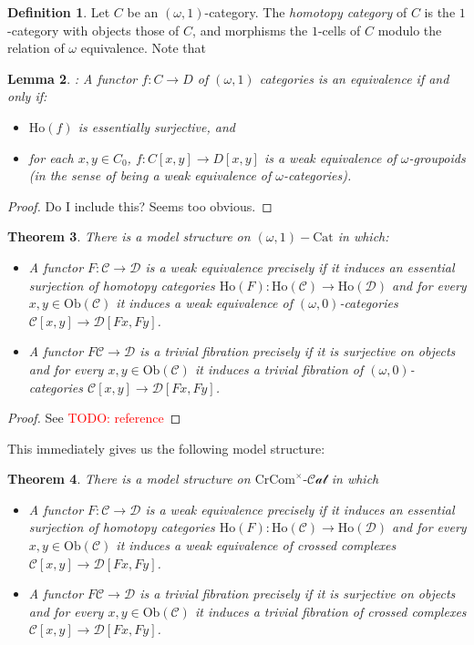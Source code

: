 \documentclass[12pt]{article}
\newtheorem{theorem}{Theorem}[section]
\newtheorem{lemma}[theorem]{Lemma}
\theoremstyle{definition}
\newtheorem{definition}[theorem]{Definition}
\newcommand{\TODO}[1]{\textcolor{red}{TODO: {#1}}}
\newcommand{\C}{\mathcal{C}}
\newcommand{\D}{\mathcal{D}}
\newcommand{\crcom}{\text{CrCom}}
\newcommand{\cartcrossedcat}{\crcom^\times\text{-}\mathcal{Cat}}
\newcommand{\Ho}{\text{Ho}}
\begin{document}
	\begin{definition}
		Let $C$ be an $(\omega,1)$-category. The \textit{homotopy category} of $C$ is the $1$-category with objects those of $C$, and morphisms the $1$-cells of $C$ modulo the relation of $\omega$ equivalence. Note that 
	\end{definition}
	\begin{lemma}: 
		A functor $f: C \to D$ of $(\omega,1)$ categories is an equivalence if and only if:
		\begin{itemize}
			\item $\Ho(f)$ is essentially surjective, and
			\item for each $x,y \in C_0$, $f: C[x,y] \to D[x,y]$ is a weak equivalence of $\omega$-groupoids (in the sense of being a weak equivalence of $\omega$-categories).
		\end{itemize}
	\end{lemma}
	\begin{proof}
		Do I include this? Seems too obvious.
	\end{proof}
	\begin{theorem}
		There is a model structure on $(\omega,1)-\text{Cat}$ in which:
		\begin{itemize}
			\item A functor $F: \C \to \D$ is a weak equivalence precisely if it induces an essential surjection of homotopy categories $\text{Ho}(F) : \text{Ho}(\C) \to \text{Ho}(\D)$ and for every $x,y \in \text{Ob}(\C)$ it induces a weak equivalence of $(\omega,0)$-categories $\C[x,y] \to \D[Fx,Fy]$.
			\item A functor $F \C \to \D$ is a trivial fibration precisely if it is surjective on objects and for every $x,y \in \text{Ob}(\C)$ it induces a trivial fibration of $(\omega,0)$-categories $\C[x,y] \to \D[Fx,Fy]$. 
		\end{itemize}			 
	\end{theorem}
	\begin{proof}
		See \TODO{reference}
	\end{proof}
	This immediately gives us the following model structure:
	\begin{theorem}
		There is a model structure on $\cartcrossedcat$ in which
		\begin{itemize}
			\item A functor $F: \C \to \D$ is a weak equivalence precisely if it induces an essential surjection of homotopy categories $\text{Ho}(F) : \text{Ho}(\C) \to \text{Ho}(\D)$ and for every $x,y \in \text{Ob}(\C)$ it induces a weak equivalence of crossed complexes $\C[x,y] \to \D[Fx,Fy]$.
			\item A functor $F \C \to \D$ is a trivial fibration precisely if it is surjective on objects and for every $x,y \in \text{Ob}(\C)$ it induces a trivial fibration of crossed complexes $\C[x,y] \to \D[Fx,Fy]$. 
		\end{itemize}
	\end{theorem}
\end{document}
